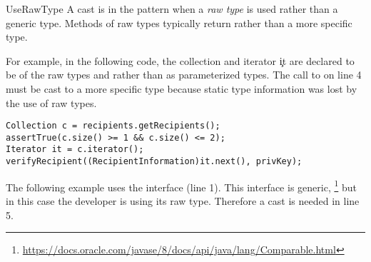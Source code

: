 \begin{pattern}{UseRawType}
A cast is in the \thisp{} pattern when a \emph{raw type} is used rather than a generic type.
Methods of raw types typically return  rather than a more specific type.

\instances{}
For example, in the following code,
the collection  and iterator \c{it} are declared to be of the raw types  and  rather than as parameterized types.
The call to  on line 4 must be cast to a more specific type because static type information was lost by the use of raw types.

\def\urlvar{http://bit.ly/bcgit_bc_java_2SD2HLm}
\begin{verbatim}
Collection c = recipients.getRecipients();
assertTrue(c.size() >= 1 && c.size() <= 2);
Iterator it = c.iterator();
verifyRecipient((RecipientInformation)it.next(), privKey);
\end{verbatim}



The following example uses the  interface (line 1).
This interface is generic,%
\footnote{\url{https://docs.oracle.com/javase/8/docs/api/java/lang/Comparable.html}}
but in this case the developer is using its raw type.
Therefore a cast is needed in line 5.


\end{pattern}
